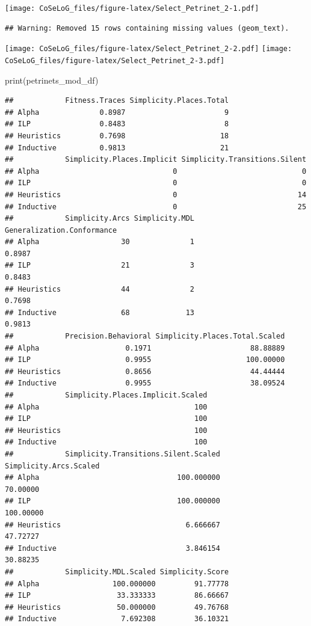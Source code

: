 \documentclass[]{article}
\newenvironment{Shaded}{\begin{snugshade}}{\end{snugshade}}
\newcommand{\KeywordTok}[1]{\textcolor[rgb]{0.94,0.87,0.69}{{#1}}}
\newcommand{\NormalTok}[1]{\textcolor[rgb]{0.80,0.80,0.80}{{#1}}}
\begin{document}
\texttt{[image: CoSeLoG\_files/figure-latex/Select\_Petrinet\_2-1.pdf]}

\begin{verbatim}
## Warning: Removed 15 rows containing missing values (geom_text).
\end{verbatim}

\texttt{[image: CoSeLoG\_files/figure-latex/Select\_Petrinet\_2-2.pdf]}
\texttt{[image: CoSeLoG\_files/figure-latex/Select\_Petrinet\_2-3.pdf]}

\begin{Shaded}
\begin{Highlighting}[]
\KeywordTok{print}\NormalTok{(petrinets_mod_df)}
\end{Highlighting}
\end{Shaded}

\begin{verbatim}
##            Fitness.Traces Simplicity.Places.Total
## Alpha              0.8987                       9
## ILP                0.8483                       8
## Heuristics         0.7698                      18
## Inductive          0.9813                      21
##            Simplicity.Places.Implicit Simplicity.Transitions.Silent
## Alpha                               0                             0
## ILP                                 0                             0
## Heuristics                          0                            14
## Inductive                           0                            25
##            Simplicity.Arcs Simplicity.MDL Generalization.Conformance
## Alpha                   30              1                     0.8987
## ILP                     21              3                     0.8483
## Heuristics              44              2                     0.7698
## Inductive               68             13                     0.9813
##            Precision.Behavioral Simplicity.Places.Total.Scaled
## Alpha                    0.1971                       88.88889
## ILP                      0.9955                      100.00000
## Heuristics               0.8656                       44.44444
## Inductive                0.9955                       38.09524
##            Simplicity.Places.Implicit.Scaled
## Alpha                                    100
## ILP                                      100
## Heuristics                               100
## Inductive                                100
##            Simplicity.Transitions.Silent.Scaled Simplicity.Arcs.Scaled
## Alpha                                100.000000               70.00000
## ILP                                  100.000000              100.00000
## Heuristics                             6.666667               47.72727
## Inductive                              3.846154               30.88235
##            Simplicity.MDL.Scaled Simplicity.Score
## Alpha                 100.000000         91.77778
## ILP                    33.333333         86.66667
## Heuristics             50.000000         49.76768
## Inductive               7.692308         36.10321
\end{verbatim}
\end{document}
